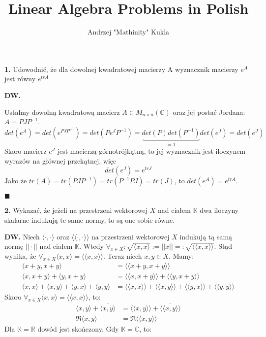 \documentclass{article}
\title{Linear Algebra Problems in Polish}
\author{Andrzej "Mathinity" Kukla}
\date{ }
\begin{document}
\maketitle

\begin{center}
\large \textbf{1.} Udowodnić, że dla dowolnej kwadratowej macierzy A wyznacznik macierzy $e^A$ jest równy $e^{trA}$
\end{center}
\normalsize{}
\begin{flushleft}
\textbf{DW.}
\end{flushleft}
Ustalmy dowolną kwadratową macierz $A\in M_{n\times n}(\mathds{C})$ oraz jej postać Jordana: $A=PJP^{-1}$.
$$det(e^A)=det(e^{PJP^{-1}})=det(Pe^JP^{-1})=\underbrace{det(P)det(P^{-1})}_{=1}det(e^J)=det(e^J)$$
Skoro macierz $e^J$ jest macierzą górnotrójkątną, to jej wyznacznik jest iloczynem wyrazów na głównej przekątnej, więc 
$$det(e^J)=e^{trJ}$$
Jako że $tr(A)=tr(PJP^{-1})=tr(P^{-1}PJ)=tr(J)$, to $det(e^A)=e^{trA}$.
\begin{flushright}
$\blacksquare$
\end{flushright}
\begin{center}
\large \textbf{2.} Wykazać, że jeżeli na przestrzeni wektorowej $X$ nad ciałem $\mathds{K}$ dwa iloczyny skalarne indukują te same normy, to są one sobie równe.
\end{center}
\normalsize{}
\textbf{DW.}
Niech $\langle \cdot,\cdot\rangle$ oraz $\langle\langle\cdot,\cdot\rangle\rangle$ na przestrzeni wektorowej $X$ indukują tą samą normę $||\cdot||$ nad ciałem $\mathds{K}$. Wtedy $\forall_{x\in X}:\sqrt{\langle x,x\rangle} := ||x|| =: \sqrt{\langle\langle x,x\rangle\rangle}$. Stąd wynika, że $\forall_{x\in X}\langle x,x\rangle=\langle\langle x,x\rangle\rangle$. Teraz niech $x,y\in X$. Mamy: 
\begin{align*}
\langle x+y,x+y\rangle&=\langle\langle x+y,x+y\rangle\rangle\\
\langle x,x+y\rangle + \langle y,x+y\rangle&=\langle\langle x,x+y\rangle\rangle + \langle\langle y,x+y\rangle\rangle\\
\langle x,x\rangle + \langle x,y \rangle + \langle y,x \rangle + \langle y,y \rangle &= \langle\langle x,x\rangle\rangle + \langle\langle x,y \rangle\rangle + \langle\langle y,x \rangle\rangle + \langle\langle y,y \rangle\rangle
\end{align*}
Skoro $\forall_{x\in X}\langle x,x\rangle=\langle\langle x,x\rangle\rangle$, to:
\begin{align*}
    \langle x,y \rangle + \overline{\langle x,y \rangle} &= \langle\langle x,y \rangle\rangle + \overline{\langle\langle x,y \rangle\rangle}\\
    \mathfrak{R}\langle x,y \rangle&=\mathfrak{R}\langle\langle x,y \rangle\rangle
\end{align*}
Dla $\mathds{K}=\mathds{R}$ dowód jest skończony. Gdy $\mathds{K}=\mathds{C}$, to:
\end{document}
